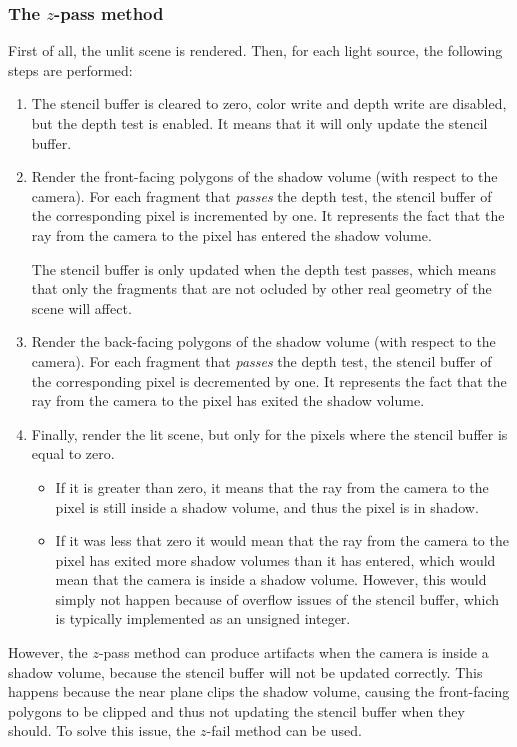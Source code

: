 \subsubsection{The $z$-pass method}

First of all, the unlit scene is rendered. Then, for each light source, the following steps are performed:
\begin{enumerate}
    \item The stencil buffer is cleared to zero, color write and depth write are disabled, but the depth test is enabled. It means that it will only update the stencil buffer.
    \item Render the front-facing polygons of the shadow volume (with respect to the camera). For each fragment that \emph{passes} the depth test, the stencil buffer of the corresponding pixel is incremented by one. It represents the fact that the ray from the camera to the pixel has entered the shadow volume.
    
    The stencil buffer is only updated when the depth test passes, which means that only the fragments that are not ocluded by other real geometry of the scene will affect.
    \item Render the back-facing polygons of the shadow volume (with respect to the camera). For each fragment that \emph{passes} the depth test, the stencil buffer of the corresponding pixel is decremented by one. It represents the fact that the ray from the camera to the pixel has exited the shadow volume.
    
    \item Finally, render the lit scene, but only for the pixels where the stencil buffer is equal to zero.
    \begin{itemize}
        \item  If it is greater than zero, it means that the ray from the camera to the pixel is still inside a shadow volume, and thus the pixel is in shadow.
        \item If it was less that zero it would mean that the ray from the camera to the pixel has exited more shadow volumes than it has entered, which would mean that the camera is inside a shadow volume. However, this would simply not happen because of overflow issues of the stencil buffer, which is typically implemented as an unsigned integer.
    \end{itemize}
\end{enumerate}

However, the $z$-pass method can produce artifacts when the camera is inside a shadow volume, because the stencil buffer will not be updated correctly. This happens because the near plane clips the shadow volume, causing the front-facing polygons to be clipped and thus not updating the stencil buffer when they should. To solve this issue, the $z$-fail method can be used.

